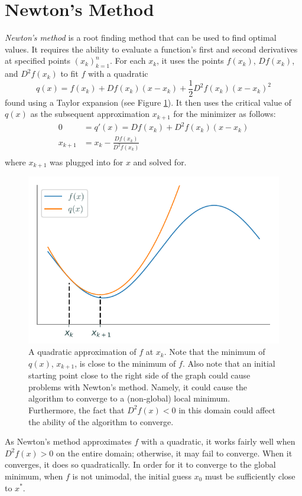 \section*{Newton's Method} %

\emph{Newton's method} is a root finding method that can be used to find optimal values.
It requires the ability to evaluate a function's first and second derivatives at specified points $(x_k)_{k=1}^n$.
For each $x_k$, it uses the points $f(x_k)$, $Df(x_k)$, and $D^2 f(x_k)$ to fit $f$ with a quadratic
$$q(x) = f(x_k) + Df(x_k) (x - x_k) + \frac{1}{2} D^2 f(x_k) (x - x_k)^2$$
found using a Taylor expansion (see Figure \ref{linesearch:quadratic}).
It then uses the critical value of $q(x)$ as the subsequent approximation $x_{k+1}$ for the minimizer as follows:
\begin{align*}
0 &= q'(x) = Df(x_k) + D^2 f(x_k)(x-x_k) \\
x_{k+1} &= x_k - \frac{Df(x_k)}{D^2 f(x_k)} \\
\end{align*}
where $x_{k+1}$ was plugged into for $x$ and solved for.

\begin{figure}[H]
\centering
\includegraphics[width = .7 \textwidth]{figures/quad_approx.pdf}
\caption{A quadratic approximation of $f$ at $x_k$.
Note that the minimum of $q(x)$, $x_{k+1}$, is close to the minimum of $f$.
Also note that an initial starting point close to the right side of the graph could cause problems with Newton's method.
Namely, it could cause the algorithm to converge to a (non-global) local minimum.
Furthermore, the fact that $D^2 f(x) < 0$ in this domain could affect the ability of the algorithm to converge.}
\label{linesearch:quadratic}
\end{figure}

As Newton's method approximates $f$ with a quadratic, it works fairly well when $D^2 f(x) > 0$ on the entire domain; otherwise, it may fail to converge.
When it converges, it does so quadratically.
In order for it to converge to the global minimum, when $f$ is not unimodal, the initial guess $x_0$ must be sufficiently close to $x^*$.

